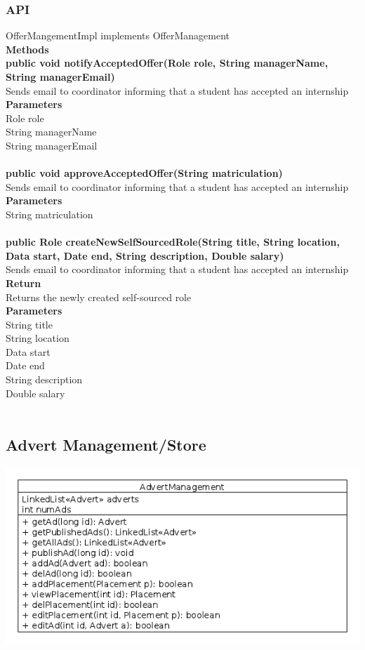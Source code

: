 \documentclass{l3deliverable}
\begin{document}
\subsubsection{API}
OfferMangementImpl implements OfferManagement\\
\textbf{Methods}\\
\textbf{public void notifyAcceptedOffer(Role role, String managerName, String managerEmail)}\\
Sends email to coordinator informing that a student has accepted an internship\\
\textbf{Parameters}\\
Role role\\
String managerName\\
String managerEmail\\
\\
\textbf{public void approveAcceptedOffer(String matriculation)}\\
Sends email to coordinator informing that a student has accepted an internship\\
\textbf{Parameters}\\
String matriculation\\
\\
\textbf{public Role createNewSelfSourcedRole(String title, String location, Data start, Date end, String description, Double salary)}\\
Sends email to coordinator informing that a student has accepted an internship\\
\textbf{Return}\\
Returns the newly created self-sourced role\\
\textbf{Parameters}\\
String title\\
String location\\
Data start\\
Date end\\
String description\\
Double salary\\
\\

\subsection{Advert Management/Store}
\includegraphics[scale = 0.5]{adStore.png}
\end{document}
